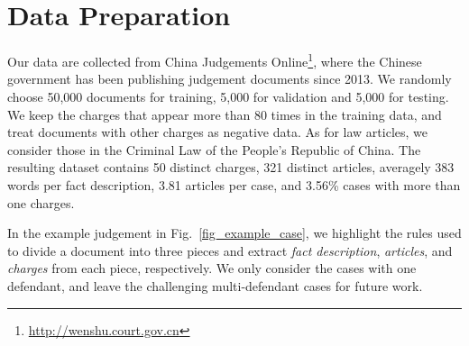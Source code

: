 \section{Data Preparation} 
Our data are collected from China Judgements Online\footnote{\url{http://wenshu.court.gov.cn}}, where the Chinese government has been publishing judgement documents since 2013.
We randomly choose 50,000 documents for training, 5,000 for validation and 5,000 for testing. We keep the charges that appear more than 80 times in the training data, and treat documents with other charges as negative data. As for law articles, we consider those in the Criminal Law of the People's Republic of China. The resulting dataset contains 50 distinct charges, 321 distinct articles, averagely  383 words per fact description, 3.81 articles per case, and 3.56\% cases with more than one charges.

In the example judgement in Fig.~\ref{fig_example_case}, we highlight the rules used to  
divide a document into three pieces %
and extract \textit{fact description}, \textit{articles}, and \textit{charges} from each piece, respectively.
We only consider the cases with one defendant, and leave the challenging multi-defendant cases for future work.





